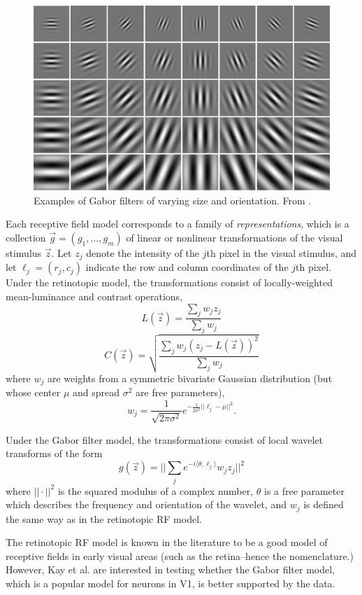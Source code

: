 \begin{figure}
\centering
\includegraphics[scale = 0.5]{Figures/Gabor.jpg}
\caption{Examples of Gabor filters of varying size and orientation.  From \cite{haghighat2015cloudid}.}
\label{fig:gabor}
\end{figure}

Each receptive field model corresponds to a family of
\emph{representations}, which is a collection $\vec{g} = (g_1,\hdots,
g_m)$ of linear or nonlinear transformations of the visual stimulus
$\vec{z}$.  Let $z_j$ denote the intensity of the $j$th pixel in the
visual stimulus, and let $\ell_j = (r_j, c_j)$ indicate the row and
column coordinates of the $j$th pixel.  Under the retinotopic model,
the transformations consist of locally-weighted mean-luminance and
contrast operations,
\[
L(\vec{z}) = \frac{\sum_j w_j z_j}{\sum_j w_j}
\]
\[
C(\vec{z}) = \sqrt{\frac{\sum_j w_j (z_j - L(\vec{z}))^2}{\sum_j w_j}}
\]
where $w_j$ are weights from a symmetric bivariate Gaussian
distribution (but whose center $\mu$ and spread $\sigma^2$ are free
parameters),
\[
w_j = \frac{1}{\sqrt{2\pi\sigma^2}}e^{-\frac{1}{2\sigma^2}||\ell_j - \mu||^2}.
\]

Under the Gabor filter model, the transformations consist of local
wavelet transforms of the form
\[
g(\vec{z}) = ||\sum_j e^{-i\langle\theta, \ell_j\rangle} w_j z_j||^2
\]
where $||\cdot||^2$ is the squared modulus of a complex number,
$\theta$ is a free parameter which describes the frequency and
orientation of the wavelet, and $w_j$ is defined the same way as in
the retinotopic RF model.

The retinotopic RF model is known in the literature to be a good model
of receptive fields in early visual areas (such as the retina--hence
the nomenclature.)  However, Kay et al. are interested in testing
whether the Gabor filter model, which is a popular model for neurons
in V1, is better supported by the data.

